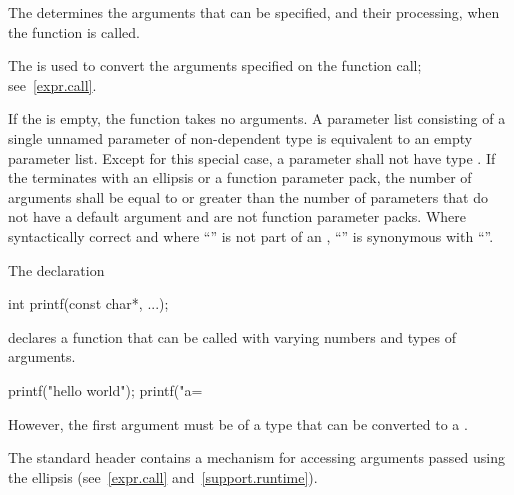 \pnum
{}%
The
determines the arguments that can be specified, and their processing, when the function is called.
\begin{note}
%
The
is used to convert the arguments specified on the function call;
see~\ref{expr.call}.
\end{note}
%
If the
is empty, the function takes no arguments.
A parameter list consisting of a single unnamed parameter of
non-dependent type  is equivalent to an empty parameter
list.
%
Except for this special case, a parameter shall not have type 
.
If the
%
%
%
%
%
terminates with an ellipsis or a function parameter
pack, the number of arguments shall be equal
to or greater than the number of parameters that do not have a default
argument and are not function parameter packs.
Where syntactically correct and where ``'' is not
part of an ,
``''
is synonymous with
``''.
\begin{example}
The declaration

\begin{codeblock}
int printf(const char*, ...);
\end{codeblock}

declares a function that can be called with varying numbers and types of arguments.

\begin{codeblock}
printf("hello world");
printf("a=%
\end{codeblock}

However, the first argument must be of a type
that can be converted to a
.
\end{example}
\begin{note}
The standard header
%
contains a mechanism for accessing arguments passed using the ellipsis
(see~\ref{expr.call} and~\ref{support.runtime}).
\end{note}

